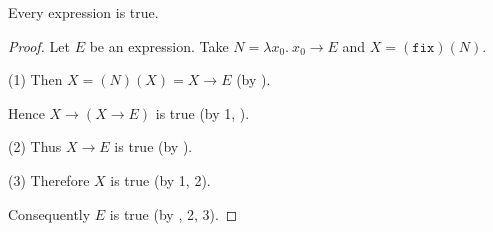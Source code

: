 \documentclass{article}
\newcommand{\varzero}{x_0}
\newcommand{\abs}[2]{\lambda#1.\ #2}
\newcommand{\app}[2]{(#1)(#2)}
\newcommand{\fix}{\texttt{fix}}
\begin{document}
  \begin{forthel}
    \begin{theorem*}\label{curry_paradox}
      Every expression is true.
    \end{theorem*}
    \begin{proof}
      Let $E$ be an expression.
      Take $N = \abs{\varzero}{\varzero \rightarrow E}$ and $X = \app{\fix}{N}.$
  
      (1) Then $X = \app{N}{X} = X \rightarrow E$ (by ).
  
      Hence $X \rightarrow (X \rightarrow E)$ is true (by 1, ).
  
      (2) Thus $X \rightarrow E$ is true (by ).
  
      (3) Therefore $X$ is true (by 1, 2).
  
      Consequently $E$ is true (by , 2, 3).
    \end{proof}
  \end{forthel}

  \printbibliography
\end{document}
